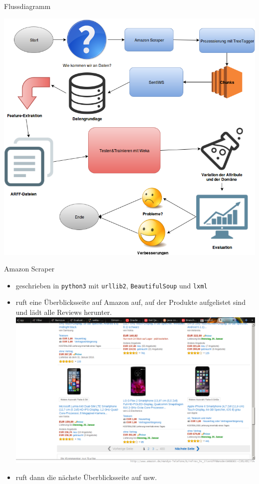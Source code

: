\documentclass[note=hide]{beamer} %
\newcommand{\pymodule}[1]{\texttt{#1}}
\newcommand{\proglang}[1]{\texttt{#1}}
\begin{document}
\begin{frame}{Flussdiagramm}
	\begin{center}
	\includegraphics[scale=0.287]{flussdiagramm.png}
	\end{center}
\end{frame}

\begin{frame}{Amazon Scraper}
	\begin{itemize}
		\item geschrieben in \proglang{python3} mit \pymodule{urllib2}, \pymodule{BeautifulSoup} und \pymodule{lxml}
		\item ruft eine Überblicksseite auf Amazon auf, auf der Produkte aufgelistet sind und lädt alle Reviews herunter.\\[0.3cm]
			\includegraphics[height=0.6\textheight]{amazon_overview_smartphones.png}
		\item ruft dann die nächste Überblicksseite auf usw.
	\end{itemize}
\end{frame}
\end{document}
